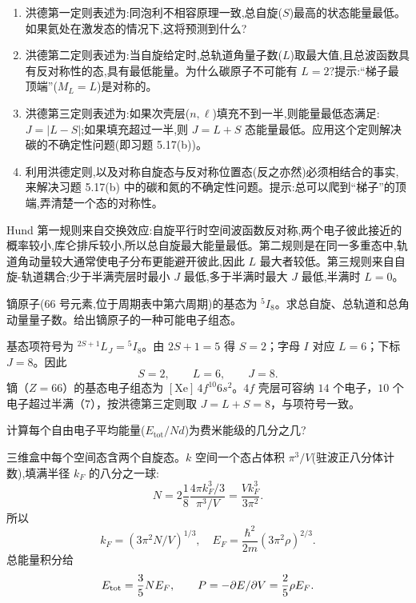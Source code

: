 \begin{question}
\begin{enumerate}
\item 洪德第一定则表述为:同泡利不相容原理一致,总自旋($S$)最高的状态能量最低。如果氦处在激发态的情况下,这将预测到什么?
\item 洪德第二定则表述为:当自旋给定时,总轨道角量子数($L$)取最大值,且总波函数具有反对称性的态,具有最低能量。为什么碳原子不可能有 $L=2$?提示:“梯子最顶端”($M_L=L$)是对称的。
\item 洪德第三定则表述为:如果次壳层($n,\ell$)填充不到一半,则能量最低态满足:$J=|L-S|$;如果填充超过一半,则 $J=L+S$ 态能量最低。应用这个定则解决碳的不确定性问题(即习题 5.17(b))。
\item 利用洪德定则,以及对称自旋态与反对称位置态(反之亦然)必须相结合的事实,来解决习题 5.17(b) 中的碳和氮的不确定性问题。提示:总可以爬到“梯子”的顶端,弄清楚一个态的对称性。
\end{enumerate}
\begin{solution}

Hund 第一规则来自交换效应:自旋平行时空间波函数反对称,两个电子彼此接近的概率较小,库仑排斥较小,所以总自旋最大能量最低。第二规则是在同一多重态中,轨道角动量较大通常使电子分布更能避开彼此,因此 $L$ 最大者较低。第三规则来自自旋-轨道耦合;少于半满壳层时最小 $J$ 最低,多于半满时最大 $J$ 最低,半满时 $L=0$。

\end{solution}
\end{question}

\begin{question}
镝原子(66 号元素,位于周期表中第六周期)的基态为 ${}^{5}I_{8}$。求总自旋、总轨道和总角动量量子数。给出镝原子的一种可能电子组态。
\begin{solution}

基态项符号为 ${}^{2S+1}L_J={}^{5}I_{8}$。由 $2S+1=5$ 得 $S=2$；字母 $I$ 对应 $L=6$；下标 $J=8$。因此
\[
S=2,\qquad L=6,\qquad J=8.
\]
镝（$Z=66$）的基态电子组态为 $[\mathrm{Xe}]\,4f^{10}6s^2$。$4f$ 壳层可容纳 $14$ 个电子，$10$ 个电子超过半满（$7$），按洪德第三定则取 $J=L+S=8$，与项符号一致。

\end{solution}
\end{question}

\begin{question}
计算每个自由电子平均能量($E_{\mathrm{tot}}/Nd$)为费米能级的几分之几?
\begin{solution}

三维盒中每个空间态含两个自旋态。$k$ 空间一个态占体积 $\pi^3/V$(驻波正八分体计数),填满半径 $k_F$ 的八分之一球:
\[
N=2\frac{1}{8}\frac{4\pi k_F^3/3}{\pi^3/V}=\frac{Vk_F^3}{3\pi^2}.
\]
所以
\[
k_F=(3\pi^2N/V)^{1/3},
\quad
E_F=\frac{\hbar^2}{2m}(3\pi^2\rho)^{2/3}.
\]
总能量积分给
\[
E_{\rm tot}=\frac35NE_F,
\qquad
P=-\partial E/\partial V=\frac25\rho E_F.
\]

\end{solution}
\end{question}

